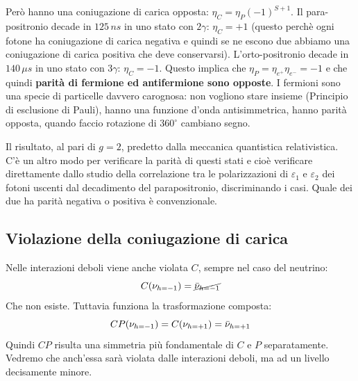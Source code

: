 Però hanno una coniugazione di carica opposta: $\eta_C=\eta_P(-1)^{S+1}$. Il para-positronio decade in $125\,ns$ in uno stato con $2\gamma$: $\eta_C=+1$ (questo perchè ogni fotone ha coniugazione di carica negativa e quindi se ne escono due abbiamo una coniugazione di carica positiva che deve conservarsi). L'orto-positronio decade in $140\,\mu s$ in uno stato con $3\gamma$: $\eta_C=-1$. Questo implica che $\eta_P=\eta_{e^+}\eta_{e^-}=-1$ e che quindi \textbf{parità di fermione ed antifermione sono opposte}. I fermioni sono una specie di particelle davvero carognosa: non vogliono stare insieme (Principio di esclusione di Pauli), hanno una funzione d'onda antisimmetrica, hanno parità opposta, quando faccio rotazione di $360^\circ$ cambiano segno.

Il risultato, al pari di $g=2$, predetto dalla meccanica quantistica relativistica. C'è un altro modo per verificare la parità di questi stati e cioè verificare direttamente dallo studio della correlazione tra le polarizzazioni di $\varepsilon_1$ e $\varepsilon_2$ dei fotoni uscenti dal decadimento del parapositronio, discriminando i casi.
Quale dei due ha parità negativa o positiva è convenzionale.
\subsection{Violazione della coniugazione di carica}
Nelle interazioni deboli viene anche violata $C$, sempre nel caso del neutrino:
\begin{equation*}
    C(\nu_{h=-1})=\cancel{\Bar{\nu}_{h=-1}}
\end{equation*}
Che non esiste. Tuttavia funziona la trasformazione composta:
\begin{equation*}
    CP(\nu_{h=-1})=C(\nu_{h=+1})=\Bar{\nu}_{h=+1}
\end{equation*}
Quindi $CP$ risulta una simmetria più fondamentale di $C$ e $P$ separatamente. Vedremo che anch'essa sarà violata dalle interazioni deboli, ma ad un livello decisamente minore.

